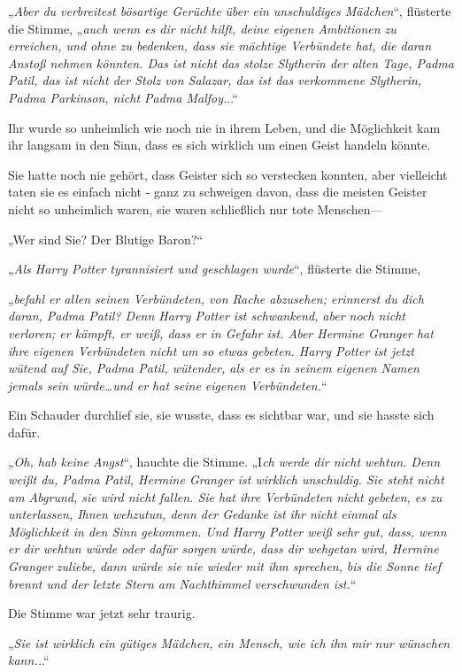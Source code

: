 {„\emph{Aber du verbreitest bösartige Gerüchte über ein unschuldiges Mädchen}“, flüsterte die Stimme, „\emph{auch wenn es dir nicht hilft, deine eigenen Ambitionen zu erreichen, und ohne zu bedenken, dass sie mächtige Verbündete hat, die daran Anstoß nehmen könnten. Das ist nicht das stolze Slytherin der alten Tage, Padma Patil, das ist nicht der Stolz von Salazar, das ist das verkommene Slytherin, Padma Parkinson, nicht Padma Malfoy.}..“

Ihr wurde so unheimlich wie noch nie in ihrem Leben, und die Möglichkeit kam ihr langsam in den Sinn, dass es sich wirklich um einen Geist handeln könnte.

Sie hatte noch nie gehört, dass Geister sich so verstecken konnten, aber vielleicht taten sie es einfach nicht - ganz zu schweigen davon, dass die meisten Geister nicht so unheimlich waren, sie waren schließlich nur tote Menschen—

„Wer sind Sie? Der Blutige Baron?“

„\emph{Als Harry Potter tyrannisiert und geschlagen wurde}“, flüsterte die Stimme,

„\emph{befahl er allen seinen Verbündeten, von Rache abzusehen; erinnerst du dich daran, Padma Patil? Denn Harry Potter ist schwankend, aber noch nicht verloren; er kämpft, er weiß, dass er in Gefahr ist. Aber Hermine Granger hat ihre eigenen Verbündeten nicht um so etwas gebeten. Harry Potter ist jetzt wütend auf Sie, Padma Patil, wütender, als er es in seinem eigenen Namen jemals sein würde…und er hat seine eigenen Verbündeten.}“

Ein Schauder durchlief sie, sie wusste, dass es sichtbar war, und sie hasste sich dafür.

„\emph{Oh, hab keine Angst}“, hauchte die Stimme. „I\emph{ch werde dir nicht wehtun. Denn weißt du, Padma Patil, Hermine Granger ist wirklich unschuldig. Sie steht nicht am Abgrund, sie wird nicht fallen. Sie hat ihre Verbündeten nicht gebeten, es zu unterlassen, Ihnen wehzutun, denn der Gedanke ist ihr nicht einmal als Möglichkeit in den Sinn gekommen. Und Harry Potter weiß sehr gut, dass, wenn er dir wehtun würde oder dafür sorgen würde, dass dir wehgetan wird, Hermine Granger zuliebe, dann würde sie nie wieder mit ihm sprechen, bis die Sonne tief brennt und der letzte Stern am Nachthimmel verschwunden ist.}“

Die Stimme war jetzt sehr traurig.

„\emph{Sie ist wirklich ein gütiges Mädchen, ein Mensch, wie ich ihn mir nur wünschen kann..}.“

}
